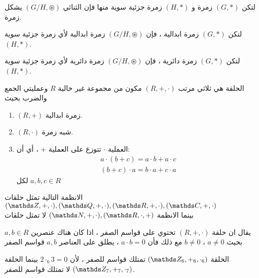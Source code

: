   \begin{theorem}
  	لتكن $(G, *)$ زمرة و $(H, *)$ زمرة جزئية سوية منها فإن الثنائي $(G/H, \circledast)$ يشكل زمرة.
  \end{theorem}
  
  \begin{theorem}
  	لتكن $(G, *)$ زمرة ابدالية ، فإن $(G/H, \circledast)$ زمرة ابدالية لأي زمرة جزئية سوية $(H, *)$.
  \end{theorem}
  
  \begin{theorem}
  	لتكن $(G, *)$ زمرة دائرية ، فإن $(G/H, \circledast)$ زمرة دائرية لأي زمرة جزئية سوية $(H, *)$.
  \end{theorem}
  

 \newpage
 \begin{definition}
 	الحلقة هي ثلاثي مرتب $(R, +, \cdot)$ مكون من مجموعة غير خالية $R$ وعمليتي الجمع والضرب بحيث 
 	\begin{enumerate}[label=$\boxed{\arabic*}$]
 		\item $(R, +)$ زمرة ابدالية.
 		\item  $(R, \cdot) $ شبه زمرة.
 		\item العملية $\cdot$ تتوزع على العملية + ، أي أن:
 		\begin{gather*}
 			a\cdot (b+c) = a\cdot b + a\cdot c \tag{التوزيع من اليسار}\\
 			(b + c) \cdot a = b\cdot a + c\cdot a \tag{التوزيع من اليمين}
 		\end{gather*}
 		لكل $a ,b,c\in R$
 	\end{enumerate}
 \end{definition}
 
 \begin{example}
 	الانظمة التالية تمثل حلقات
 	$
 	(\Z, + ,\cdot), (\Q, + ,\cdot),(\R, + ,\cdot),(\C, + ,\cdot)
 	$\\
 	بينما الانظمة 
 	$
 	(\N, +, \cdot), (\R, \cdot, +)
 	$
 	لا تمثل حلقات
 \end{example}
 
 \begin{definition}
 	يقال ان حلقة $(R, +, \cdot)$ تحتوي على قواسم الصفر ، اذا كان هناك عنصرين $a, b\in R$ بحيث $a\neq 0$ ، $b\neq 0$ مع ذلك فأن $a\cdot b=0$ ، يطلق على العناصر $a,b$ قواسم الصفر
 \end{definition}
 
 \begin{example}
 	الحلقة
 	$(\Z_6, +_6, \cdot_6)$ تمتلك قواسم للصفر ، لأن $2\cdot_6 3=0 $ بينما الحلقة 
 	$(\Z_7, +_7, \cdot_7)$ لا تمتلك قواسم للصفر.
 \end{example}
 
